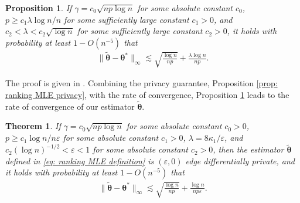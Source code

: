 \documentclass[letterpaper,12pt]{article}
\numberwithin{equation}{section}
\theoremstyle{plain}
\newtheorem{Theorem}{Theorem}
\numberwithin{Theorem}{section}
\numberwithin{corollary}{section}
\newtheorem{proposition}{Proposition}
\numberwithin{proposition}{section}
\numberwithin{Lemma}{section}
{
	\theoremstyle{definition}
	\newtheorem{Definition}{Definition}
	\newtheorem{example}{Example}
	\numberwithin{example}{section}
	\newtheorem{fact}{Fact}
	\numberwithin{fact}{section}
	\newtheorem{remark}{Remark}
}
\newcommand{\1}{\mathbbm{1}}
\def\bth{{\boldsymbol{\theta}}}
\begin{document}
\begin{proposition}\label{prop: ranking MLE accuracy}
	If $\gamma = c_0\sqrt{np\log n}$ for some absolute constant $c_0$, $p \geq c_1\lambda \log n/n$ for some sufficiently large constant $c_1 > 0$, and $c_2 < \lambda < c_2\sqrt{\log n}$ for some sufficiently large constant $c_2 > 0$, it holds with probability at least $1 - O(n^{-5})$ that
	\begin{align} \label{eq: ranking MLE accuracy}
		\|\widetilde \bth - \bth^*\|_\infty \lesssim \sqrt{\frac{\log n}{np}} + \frac{\lambda\log n}{np}.
	\end{align}	
\end{proposition}
The proof is given in \cite{cai2023optimal}. Combining the privacy guarantee, Proposition \ref{prop: ranking MLE privacy}, with the rate of convergence, Proposition \ref{prop: ranking MLE accuracy} leads to the rate of convergence of our estimator $\widetilde \bth$.

\begin{Theorem}\label{thm: ranking upper bound}
	If $\gamma = c_0\sqrt{np\log n}$ for some absolute constant $c_0 > 0$, $p \geq c_1\log n/n\varepsilon$ for some absolute constant $c_1 > 0$, $\lambda = 8\kappa_1/\varepsilon$, and $c_2(\log n)^{-1/2} < \varepsilon < 1$ for some absolute constant $c_2 > 0$,  then the estimator $\widetilde \bth$ defined in \eqref{eq: ranking MLE definition} is $(\varepsilon, 0)$ edge differentially private, and it holds with probability at least $1 - O(n^{-5})$ that
	\begin{align}\label{eq: ranking upper bound}
		\|\widetilde \bth - \bth^*\|_\infty \lesssim \sqrt{\frac{\log n}{np}} + \frac{\log n}{np\varepsilon}.
	\end{align}
\end{Theorem}
\end{document}
